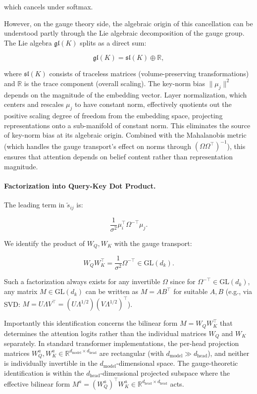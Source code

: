 \documentclass[twoside,11pt]{article}
\begin{document}
which cancels under softmax.

However, on the gauge theory side, the algebraic origin of this cancellation can be understood partly through the Lie algebraic decomposition of the gauge group. The Lie algebra $\mathfrak{gl}(K)$ splits as a direct sum:

\begin{equation}
\mathfrak{gl}(K) = \mathfrak{sl}(K) \oplus \mathbb{R},
\label{eq:gl_decomposition}
\end{equation}

where $\mathfrak{sl}(K)$ consists of traceless matrices (volume-preserving transformations) and $\mathbb{R}$ is the trace component (overall scaling). The key-norm bias $\|\mu_j\|^2$ depends on the magnitude of the embedding vector. Layer normalization, which centers and rescales $\mu_j$ to have constant norm, effectively quotients out the positive scaling degree of freedom from the embedding space, projecting representations onto a sub-manifold of constant norm. This eliminates the source of key-norm bias at its algebraic origin. Combined with the Mahalanobis metric (which handles the gauge transport's effect on norms through $(\Omega\Omega^\top)^{-1}$), this ensures that attention depends on belief content rather than representation magnitude.

\paragraph{Factorization into Query-Key Dot Product.}

The leading term in $\tilde{s}_{ij}$ is:

\begin{equation}
\frac{1}{\sigma^2}\mu_i^\top \Omega^{-\top} \mu_j.
\end{equation}

We identify the product of $W_Q, W_K$ with the gauge transport:

\begin{equation}
W_Q W_K^\top = \frac{1}{\sigma^2} \Omega^{-\top} \in \mathrm{GL}(d_k).
\end{equation}

Such a factorization always exists for any invertible $\Omega$ since for $\Omega^{-\top} \in \mathrm{GL}(d_k)$, any matrix $M \in \mathrm{GL}(d_k)$ can be written as $M = AB^\top$ for suitable $A, B$ (e.g., via SVD: $M = U\Lambda V^\top = (U\Lambda^{1/2})(V\Lambda^{1/2})^\top$).

Importantly this identification concerns the bilinear form $M = W_Q W_K^\top$ that determines the attention logits rather than the individual matrices $W_Q$ and $W_K$ separately. In standard transformer implementations, the per-head projection matrices $W_Q^a, W_K^a \in \mathbb{R}^{d_{\text{model}} \times d_{\text{head}}}$ are rectangular (with $d_{\text{model}} \gg d_{\text{head}}$), and neither is individually invertible in the $d_{\text{model}}$-dimensional space. The gauge-theoretic identification is within the $d_{\text{head}}$-dimensional projected subspace where the effective bilinear form $M^a = (W_Q^a)^\top W_K^a \in \mathbb{R}^{d_{\text{head}} \times d_{\text{head}}}$ acts.
\end{document}
